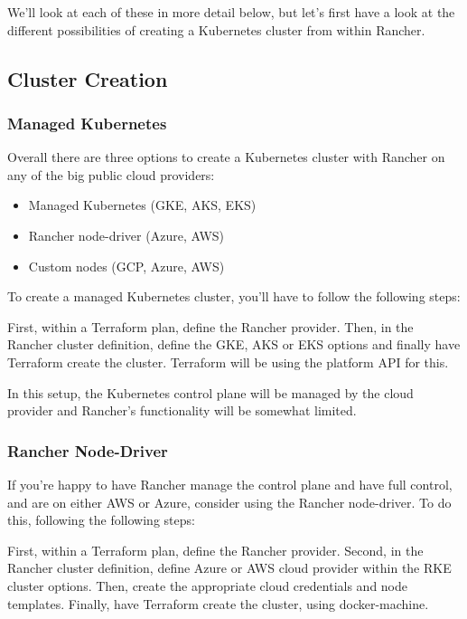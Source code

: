 We'll look at each of these in more detail below, but let's first have a look at the different possibilities of creating a Kubernetes cluster from within Rancher.

\subsection{Cluster Creation}

\subsubsection{Managed Kubernetes}

Overall there are three options to create a Kubernetes cluster with Rancher on any of the big public cloud providers:

\begin{itemize}
\item Managed Kubernetes (GKE, AKS, EKS)
\item Rancher node-driver (Azure, AWS)
\item Custom nodes (GCP, Azure, AWS)
\end{itemize}

To create a managed Kubernetes cluster, you'll have to follow the following steps:

First, within a  Terraform plan, define the Rancher provider. Then, in the Rancher cluster definition, define the GKE, AKS or EKS options and finally have Terraform create the cluster. Terraform will be using the platform API for this.

In this setup, the Kubernetes control plane will be managed by the cloud provider and Rancher's functionality will be somewhat limited.

\subsubsection{Rancher Node-Driver}

If you're happy to have Rancher manage the control plane and have full control, and are on either AWS or Azure, consider using the Rancher node-driver. To do this, following the following steps:

First, within a  Terraform plan, define the Rancher provider. Second, in the Rancher cluster definition, define Azure or AWS cloud provider within the RKE cluster options. Then, create the appropriate cloud credentials and node templates. Finally, have Terraform create the cluster, using docker-machine.

